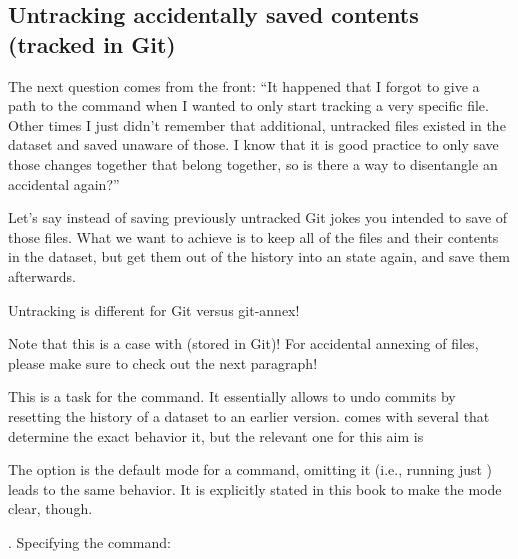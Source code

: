 \subsection{Untracking accidentally saved contents (tracked in Git)}
\label{\detokenize{basics/101-137-history:untracking-accidentally-saved-contents-tracked-in-git}}\label{\detokenize{basics/101-137-history:index-1}}
\sphinxAtStartPar
The next question comes from the front:
“It happened that I forgot to give a path to the 
command when I wanted to only start tracking a very specific file.
Other times I just didn’t remember that
additional, untracked files existed in the dataset and saved unaware of
those. I know that it is good practice to only save
those changes together that belong together, so is there a way to
disentangle an accidental  again?”

\sphinxAtStartPar
Let’s say instead of saving  previously untracked Git jokes
you intended to save  of those files. What we
want to achieve is to keep all of the files and their contents
in the dataset, but get them out of the history into an
 state again, and save them  afterwards.
\begin{importantnote}[before title={\thetcbcounter\ }, check odd page=true]{Untracking is different for Git versus git-annex!}

\sphinxAtStartPar
Note that this is a case with  (stored in Git)! For
accidental annexing of files, please make sure to check out
the next paragraph!


\end{importantnote}

\sphinxAtStartPar
This is a task for the  command. It essentially allows to
undo commits by resetting the history of a dataset to an earlier version.
 comes with several  that determine the
exact behavior it, but the relevant one for this aim is %
\begin{footnote}\sphinxAtStartFootnote
The option  is the default mode for a 
command, omitting it (i.e., running just ) leads to the
same behavior. It is explicitly stated in this book to make the mode
clear, though.
%
\end{footnote}.
Specifying the command:

